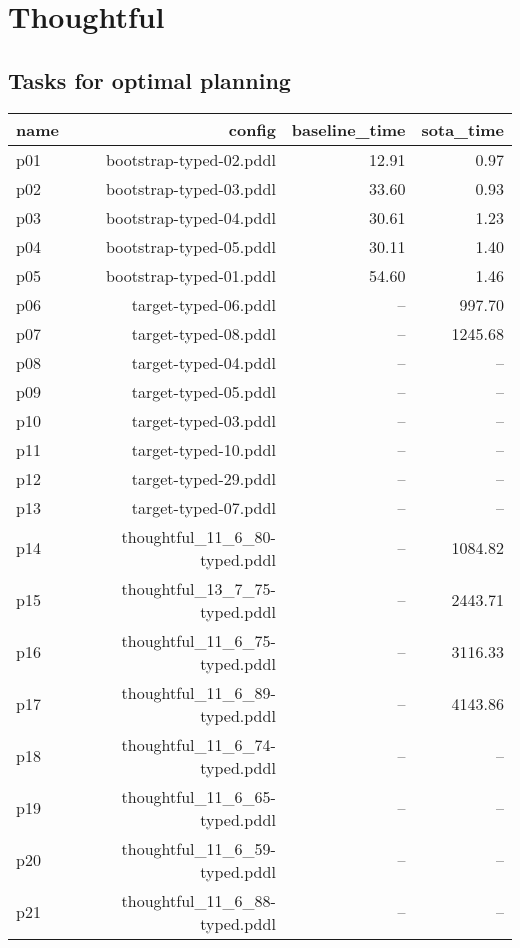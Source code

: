 \documentclass{article}
\begin{document}
                \newpage \section{Thoughtful}
                    \subsection*{Tasks for optimal planning}
                    
                            \begin{center}
                            \scriptsize
                            \begin{tabular}{@{}l|r|r|r@{}}
                            name & config & baseline\_time & sota\_time\\\midrule
                              p01& bootstrap-typed-02.pddl&12.91&0.97\\
  p02& bootstrap-typed-03.pddl&33.60&0.93\\
  p03& bootstrap-typed-04.pddl&30.61&1.23\\
  p04& bootstrap-typed-05.pddl&30.11&1.40\\
  p05& bootstrap-typed-01.pddl&54.60&1.46\\
  p06& target-typed-06.pddl&--&997.70\\
  p07& target-typed-08.pddl&--&1245.68\\
  p08& target-typed-04.pddl&--&--\\
  p09& target-typed-05.pddl&--&--\\
  p10& target-typed-03.pddl&--&--\\
  p11& target-typed-10.pddl&--&--\\
  p12& target-typed-29.pddl&--&--\\
  p13& target-typed-07.pddl&--&--\\
  p14& thoughtful\_11\_6\_80-typed.pddl&--&1084.82\\
  p15& thoughtful\_13\_7\_75-typed.pddl&--&2443.71\\
  p16& thoughtful\_11\_6\_75-typed.pddl&--&3116.33\\
  p17& thoughtful\_11\_6\_89-typed.pddl&--&4143.86\\
  p18& thoughtful\_11\_6\_74-typed.pddl&--&--\\
  p19& thoughtful\_11\_6\_65-typed.pddl&--&--\\
  p20& thoughtful\_11\_6\_59-typed.pddl&--&--\\
  p21& thoughtful\_11\_6\_88-typed.pddl&--&--\\

\end{tabular}
\end{center}
\end{document}
